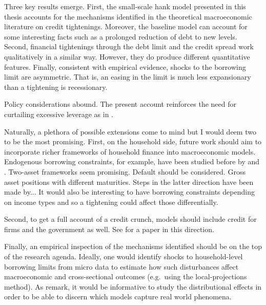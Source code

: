 \documentclass[a4paper,12pt]{article} %
\numberwithin{equation}{section} %
\numberwithin{figure}{section}
\numberwithin{table}{section}
\begin{document}
Three key results emerge. First, the small-scale \Gls{hank} model presented in this thesis accounts for the mechanisms identified in the theoretical macroeconomic literature on credit tightenings. Moreover, the baseline model can account for some interesting facts such as a prolonged reduction of debt to new levels. Second, financial tightenings through the debt limit and the credit spread work qualitatively in a similar way. However, they do produce different quantitative features. Finally, consistent with empirical evidence, shocks to the borrowing limit are asymmetric. That is, an easing in the limit is much less expansionary than a tightening is recessionary.

Policy considerations abound. The present account reinforces the need for curtailing excessive leverage as in \textcite{korinek2016}.

Naturally, a plethora of possible extensions come to mind but I would deem two to be the most promising. First, on the household side, future work should aim to incorporate richer frameworks of household finance into macroeconomic models. Endogenous borrowing constraints, for example, have been studied before by and \textcite{gl2017}. Two-asset frameworks seem promising. Default should be considered. Gross asset positions with different maturities. Steps in the latter direction have been made by... It would also be interesting to have borrowing constraints depending on income types and so a tightening could affect those differentially.

Second, to get a full account of a credit crunch, models should include credit for firms and the government as well. See \textcite{buera2020} for a paper in this direction.

Finally, an empirical inspection of the mechanisms identified should be on the top of the research agenda. Ideally, one would identify shocks to household-level borrowing limits from micro data to estimate how such disturbances affect macroeconomic and cross-sectional outcomes (e.g.~using the local-projections method). As \textcite{kv2018} remark, it would be informative to study the distributional effects in order to be able to discern which models capture real world phenomena.

\end{document}
